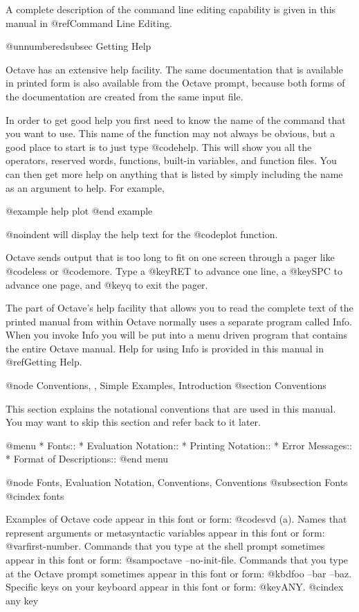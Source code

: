 {A complete description of the command line editing capability is given
in this manual in @ref{Command Line Editing}.

@unnumberedsubsec Getting Help

Octave has an extensive help facility.  The same documentation that is
available in printed form is also available from the Octave prompt,
because both forms of the documentation are created from the same input
file.

In order to get good help you first need to know the name of the command
that you want to use.  This name of the function may not always be
obvious, but a good place to start is to just type @code{help}.
This will show you all the operators, reserved words, functions,
built-in variables, and function files.  You can then get more
help on anything that is listed by simply including the name as an
argument to help.  For example,

@example
help plot
@end example

@noindent
will display the help text for the @code{plot} function.

Octave sends output that is too long to fit on one screen through a
pager like @code{less} or @code{more}.  Type a @key{RET} to advance one
line, a @key{SPC} to advance one page, and @key{q} to exit the pager.

The part of Octave's help facility that allows you to read the complete
text of the printed manual from within Octave normally uses a separate
program called Info.  When you invoke Info you will be put into a menu
driven program that contains the entire Octave manual.  Help for using
Info is provided in this manual in @ref{Getting Help}.

@node Conventions,  , Simple Examples, Introduction
@section Conventions

This section explains the notational conventions that are used in this
manual.  You may want to skip this section and refer back to it later.

@menu
* Fonts::                       
* Evaluation Notation::         
* Printing Notation::           
* Error Messages::              
* Format of Descriptions::      
@end menu

@node Fonts, Evaluation Notation, Conventions, Conventions
@subsection Fonts
@cindex fonts

Examples of Octave code appear in this font or form: @code{svd (a)}.
Names that represent arguments or metasyntactic variables appear
in this font or form: @var{first-number}.  Commands that you type at the
shell prompt sometimes appear in this font or form:
@samp{octave --no-init-file}.  Commands that you type at the Octave
prompt sometimes appear in this font or form: @kbd{foo --bar --baz}.
Specific keys on your keyboard appear in this font or form: @key{ANY}.
@cindex any key

}
